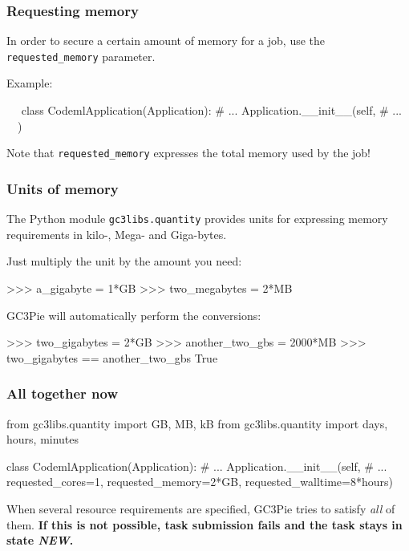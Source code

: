 \documentclass[english,serif,mathserif,xcolor=pdftex,dvipsnames,table]{beamer}
\begin{document}
\begin{frame}[fragile]
  \frametitle{Requesting memory}
  In order to secure a certain amount of memory for a job, use the
  \lstinline|requested_memory| parameter.

  \+
  Example:
\begin{python}
  ~~
  class CodemlApplication(Application):
    # ...
    Application.__init__(self,
      # ...
      ~~)
\end{python}

  \+
  Note that \lstinline|requested_memory| expresses the total
  memory used by the job!
\end{frame}

\begin{frame}[fragile]
  \frametitle{Units of memory}
  The Python module \texttt{gc3libs.quantity} provides units for
  expressing memory requirements in kilo-, Mega- and Giga-bytes.

  \+
  Just multiply the unit by the amount you need:
\begin{python}
  >>> a_gigabyte = 1*GB
  >>> two_megabytes = 2*MB
\end{python}

  \+
  GC3Pie will automatically perform the conversions:
  \begin{python}
    >>> two_gigabytes = 2*GB
    >>> another_two_gbs = 2000*MB
    >>> two_gigabytes == another_two_gbs
    True
  \end{python}
\end{frame}


\begin{frame}[fragile]
  \frametitle{All together now}

\begin{python}
from gc3libs.quantity import GB, MB, kB
from gc3libs.quantity import days, hours, minutes

class CodemlApplication(Application):
  # ...
  Application.__init__(self,
    # ...
    requested_cores=1,
    requested_memory=2*GB,
    requested_walltime=8*hours)
\end{python}

  \+ When several resource requirements are specified, GC3Pie tries to
  satisfy \emph{all} of them.  \textbf{If this is not possible, task
  submission fails and the task stays in state \emph{NEW}.}

\end{frame}
\end{document}
